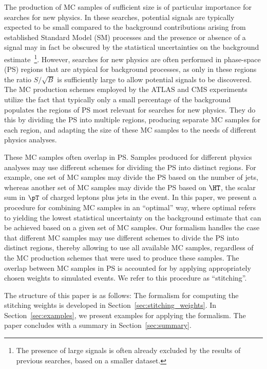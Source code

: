 The production of MC samples of sufficient size is of particular importance for searches for new physics.
In these searches, potential signals are typically expected to be small
compared to the background contributions arising from established Standard Model (SM) processes
and the presence or absence of a signal may in fact be obscured by the statistical uncertainties on the background estimate~\footnote{
The presence of large signals is often already excluded by the results of previous searches, based on a smaller dataset.}.
However, searches for new physics are often performed in phase-space (PS) regions that are atypical for background processes,
as only in these regions the ratio $S/\sqrt{B}$ is sufficiently large to allow potential signals to be discovered.
The MC production schemes employed by the ATLAS and CMS experiments utilize the fact 
that typically only a small percentage of the background populates the regions of PS most relevant for searches for new physics.
They do this by dividing the PS into multiple regions, producing separate MC samples for each region,
and adapting the size of these MC samples to the needs of different physics analyses.

These MC samples often overlap in PS.
Samples produced for different physics analyses may use different schemes for dividing the PS into distinct regions.
For example, one set of MC samples may divide the PS based on the number of jets, 
whereas another set of MC samples may divide the PS based on $\HT$, the scalar sum in $\pT$ of charged leptons plus jets in the event.
In this paper, we present a procedure for combining MC samples in an ``optimal'' way,
where optimal refers to yielding the lowest statistical uncertainty on the background estimate that can be achieved based on a given set of MC samples.
Our formalism handles the case that different MC samples may use different schemes to divide the PS into distinct regions,
thereby allowing to use all available MC samples, regardless of the MC production schemes that were used to produce these samples.
The overlap between MC samples in PS is accounted for by applying appropriately chosen weights to simulated events.
We refer to this procedure as ``stitching''.

The structure of this paper is as follows:
The formalism for computing the stitching weights is developed in Section~\ref{sec:stitching_weights}.
In Section~\ref{sec:examples}, we present examples for applying the formalism.
The paper concludes with a summary in Section~\ref{sec:summary}.
